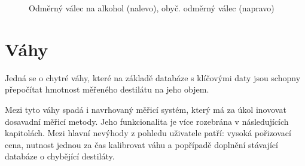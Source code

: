 \begin{figure}[H]
\begin{center}
    \end{center}
    \caption{Odměrný válec na alkohol (nalevo)\cite{Odměrný válec na alkohol}, obyč. odměrný válec (napravo)\cite{Odměrný válec}}
\end{figure}



\section{Váhy}

Jedná se o chytré váhy, které na základě databáze s klíčovými daty jsou schopny přepočítat hmotnost měřeného destilátu na jeho objem. 

Mezi tyto váhy spadá i navrhovaný měřicí systém, který má za úkol inovovat dosavadní měřicí metody. Jeho funkcionalita je více rozebrána v následujících kapitolách. Mezi hlavní nevýhody z pohledu uživatele patří: vysoká pořizovací cena, nutnost jednou za čas kalibrovat váhu a popřípadě doplnění stávající databáze o chybějící destiláty.



%
%
